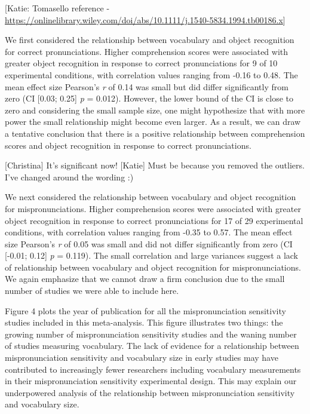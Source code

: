 \documentclass[man]{apa6}
\theoremstyle{definition}
\theoremstyle{definition}
\theoremstyle{definition}
\theoremstyle{remark}
\begin{document}
{[}Katie: Tomasello reference -
\url{https://onlinelibrary.wiley.com/doi/abs/10.1111/j.1540-5834.1994.tb00186.x}{]}

We first considered the relationship between vocabulary and object
recognition for correct pronunciations. Higher comprehension scores were
associated with greater object recognition in response to correct
pronunciations for 9 of 10 experimental conditions, with correlation
values ranging from -0.16 to 0.48. The mean effect size Pearson's
\emph{r} of 0.14 was small but did differ significantly from zero (CI
{[}0.03; 0.25{]} \emph{p} = 0.012). However, the lower bound of the CI
is close to zero and considering the small sample size, one might
hypothesize that with more power the small relationship might become
even larger. As a result, we can draw a tentative conclusion that there
is a positive relationship between comprehension scores and object
recognition in response to correct pronunciations.

{[}Christina{]} It's significant now! {[}Katie{]} Must be because you
removed the outliers. I've changed around the wording :)

We next considered the relationship between vocabulary and object
recognition for mispronunciations. Higher comprehension scores were
associated with greater object recognition in response to correct
pronunciations for 17 of 29 experimental conditions, with correlation
values ranging from -0.35 to 0.57. The mean effect size Pearson's
\emph{r} of 0.05 was small and did not differ significantly from zero
(CI {[}-0.01; 0.12{]} \emph{p} = 0.119). The small correlation and large
variances suggest a lack of relationship between vocabulary and object
recognition for mispronunciations. We again emphasize that we cannot
draw a firm conclusion due to the small number of studies we were able
to include here.

Figure 4 plots the year of publication for all the mispronunciation
sensitivity studies included in this meta-analysis. This figure
illustrates two things: the growing number of mispronunciation
sensitivity studies and the waning number of studies measuring
vocabulary. The lack of evidence for a relationship between
mispronunciation sensitivity and vocabulary size in early studies may
have contributed to increasingly fewer researchers including vocabulary
measurements in their mispronunciation sensitivity experimental design.
This may explain our underpowered analysis of the relationship between
mispronunciation sensitivity and vocabulary size.
\end{document}
